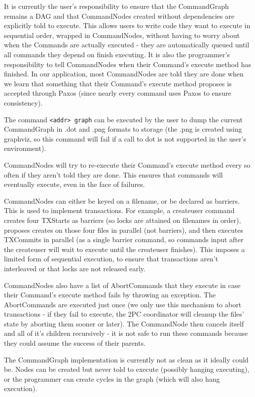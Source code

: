 \documentclass[11pt]{article}
\begin{document}
It is currently the user's responsibility to ensure that the CommandGraph remains a DAG and that CommandNodes created without dependencies are
explicitly told to execute. This allows users to write code they want to execute in sequential order, wrapped in CommandNodes, without having to
worry about when the Commands are actually executed - they are automatically queued until all commands they depend on finish executing.
It is also the programmer's responsibility to tell CommandNodes when their Command's execute method has finished. In our application,
most CommandNodes are told they are done when we learn that something that their Command's execute method proposes is accepted through Paxos (since nearly every command uses Paxos to ensure consistency).

The command \verb=<addr> graph= can be executed by the user to dump the current CommandGraph in .dot and .png formats to storage
(the .png is created using graphviz, so this command will fail if a call to dot is not supported in the user's environment).

CommandNodes will try to re-execute their Command's execute method every so often if they aren't told they are done. This ensures that commands will eventually execute, even in the face of failures.

CommandNodes can either be keyed on a filename, or be declared as barriers. This is used to implement transactions.
For example, a createuser command creates four TXStarts as barriers (so locks are attained on filenames in order), proposes creates on those four
files in parallel (not barriers), and then executes TXCommits in parallel (as a single barrier command, so commands input after the createuser will
wait to execute until the createuser finishes). This imposes a limited form of sequential execution, to ensure that transactions aren't interleaved or that locks are not released early.

CommandNodes also have a list of AbortCommands that they execute in case their Command's execute method fails by throwing an exception.
The AbortCommands are executed just once (we only use this mechanism to abort transactions - if they fail to execute, the 2PC coordinator
will cleanup the files' state by aborting them sooner or later). The CommandNode then cancels itself and all of it's children recursively -
it is not safe to run these commands because they could assume the success of their parents.

The CommandGraph implementation is currently not as clean as it ideally could be. Nodes can be created but never told to execute
(possibly hanging executing), or the programmer can create cycles in the graph (which will also hang execution).
\end{document}
